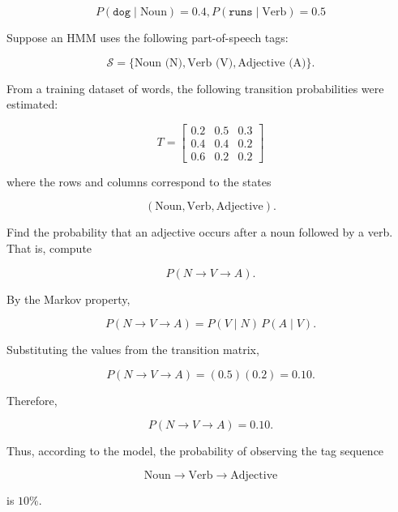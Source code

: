 $$P(\texttt{dog} \mid \text{Noun})=0.4,
P(\texttt{runs} \mid \text{Verb})=0.5$$

\begin{Exercise}[title={NLP Exercise}, label={ex:nlp}]

Suppose an HMM uses the following part-of-speech tags:

\[
\mathcal{S} = \{\text{Noun (N)}, \text{Verb (V)}, \text{Adjective (A)}\}.
\]

From a training dataset of words, the following transition probabilities were estimated:

\[
T =
\begin{bmatrix}
0.2 & 0.5 & 0.3 \\
0.4 & 0.4 & 0.2 \\
0.6 & 0.2 & 0.2
\end{bmatrix}
\]

where the rows and columns correspond to the states

\[
(\text{Noun}, \text{Verb}, \text{Adjective}).
\]

Find the probability that an adjective occurs after a noun followed by a verb. That is, compute

\[
P(N \rightarrow V \rightarrow A).
\]


\end{Exercise}

\begin{Answer}[ref={ex:nlp}]

By the Markov property,

\[
P(N \rightarrow V \rightarrow A)
=
P(V \mid N)\,P(A \mid V).
\]

Substituting the values from the transition matrix,

\[
P(N \rightarrow V \rightarrow A)
=
(0.5)(0.2)
=
0.10.
\]

Therefore,

\[
\boxed{P(N \rightarrow V \rightarrow A)=0.10.}
\]

Thus, according to the model, the probability of observing the tag sequence

\[
\text{Noun} \rightarrow \text{Verb} \rightarrow \text{Adjective}
\]

is \(10\%\).


\end{Answer}